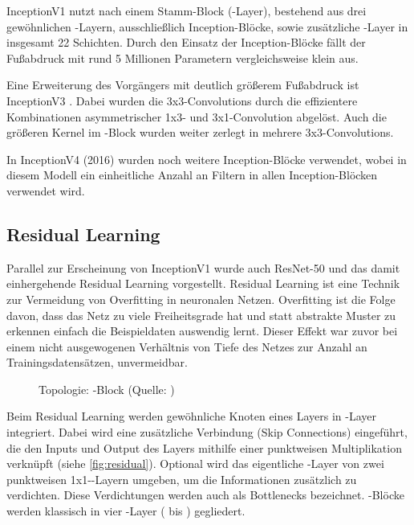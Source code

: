 InceptionV1 nutzt nach einem Stamm-Block (\stem-Layer), bestehend aus drei gewöhnlichen \conv-Layern, ausschließlich Inception-Blöcke, sowie zusätzliche \pool-Layer in insgesamt 22 Schichten.
Durch den Einsatz der Inception-Blöcke fällt der Fußabdruck mit rund 5 Millionen Parametern vergleichsweise klein aus.

Eine Erweiterung des Vorgängers mit deutlich größerem Fußabdruck ist InceptionV3 \cite{Szegedy15}.
Dabei wurden die 3x3-Convolutions durch die effizientere Kombinationen asymmetrischer 1x3- und 3x1-Convolution abgelöst.
Auch die größeren Kernel im \stem-Block wurden weiter zerlegt in mehrere 3x3-Convolutions.

In InceptionV4 (2016) \cite{Szegedy16} wurden noch weitere Inception-Blöcke verwendet, wobei in diesem Modell ein einheitliche Anzahl an Filtern in allen Inception-Blöcken verwendet wird.

\subsection{Residual Learning}

Parallel zur Erscheinung von InceptionV1 wurde auch ResNet-50 \cite{He15} und das damit einhergehende Residual Learning vorgestellt.
Residual Learning ist eine Technik zur Vermeidung von Overfitting in neuronalen Netzen.
Overfitting ist die Folge davon, dass das Netz zu viele Freiheitsgrade hat und statt abstrakte Muster zu erkennen einfach die Beispieldaten auswendig lernt.
Dieser Effekt war zuvor bei einem nicht ausgewogenen Verhältnis von Tiefe des Netzes zur Anzahl an Trainingsdatensätzen, unvermeidbar.

\begin{figure}[hb!]
    \centering
    \caption{Topologie: \res-Block (Quelle: \cite{Karim19})}
    \label{fig:residual}
\end{figure}

Beim Residual Learning werden gewöhnliche Knoten eines Layers in \res-Layer integriert.
Dabei wird eine zusätzliche Verbindung (Skip Connections) eingeführt, die den Inputs und Output des Layers mithilfe einer punktweisen Multiplikation verknüpft (siehe \autoref{fig:residual}).
Optional wird das eigentliche \conv-Layer von zwei punktweisen 1x1-\conv-Layern umgeben, um die Informationen zusätzlich zu verdichten.
Diese Verdichtungen werden auch als Bottlenecks bezeichnet.
\res-Blöcke werden klassisch in vier \res-Layer ( bis ) gegliedert.

